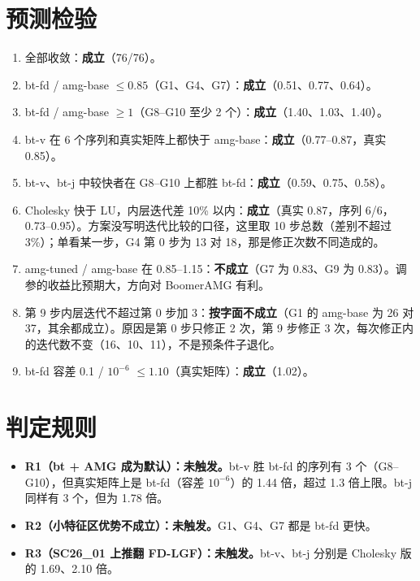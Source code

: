 \documentclass[11pt,a4paper]{ctexart}
\begin{document}
\section{预测检验}
\begin{enumerate}
\item 全部收敛：\textbf{成立}（76/76）。
\item bt-fd / amg-base $\le0.85$（G1、G4、G7）：\textbf{成立}（0.51、0.77、0.64）。
\item bt-fd / amg-base $\ge1$（G8--G10 至少 2 个）：\textbf{成立}（1.40、1.03、1.40）。
\item bt-v 在 6 个序列和真实矩阵上都快于 amg-base：\textbf{成立}（0.77--0.87，真实 0.85）。
\item bt-v、bt-j 中较快者在 G8--G10 上都胜 bt-fd：\textbf{成立}（0.59、0.75、0.58）。
\item Cholesky 快于 LU，内层迭代差 10\% 以内：\textbf{成立}（真实 0.87，序列 6/6，0.73--0.95）。方案没写明迭代比较的口径，这里取 10 步总数（差别不超过 3\%）；单看某一步，G4 第 0 步为 13 对 18，那是修正次数不同造成的。
\item amg-tuned / amg-base 在 0.85--1.15：\textbf{不成立}（G7 为 0.83、G9 为 0.83）。调参的收益比预期大，方向对 BoomerAMG 有利。
\item 第 9 步内层迭代不超过第 0 步加 3：\textbf{按字面不成立}（G1 的 amg-base 为 26 对 37，其余都成立）。原因是第 0 步只修正 2 次，第 9 步修正 3 次，每次修正内的迭代数不变（16、10、11），不是预条件子退化。
\item bt-fd 容差 0.1 / $10^{-6}$ $\le1.10$（真实矩阵）：\textbf{成立}（1.02）。
\end{enumerate}

\section{判定规则}
\begin{itemize}
\item \textbf{R1（bt + AMG 成为默认）：未触发。}bt-v 胜 bt-fd 的序列有 3 个（G8--G10），但真实矩阵上是 bt-fd（容差 $10^{-6}$）的 1.44 倍，超过 1.3 倍上限。bt-j 同样有 3 个，但为 1.78 倍。
\item \textbf{R2（小特征区优势不成立）：未触发。}G1、G4、G7 都是 bt-fd 更快。
\item \textbf{R3（SC26\_01 上推翻 FD-LGF）：未触发。}bt-v、bt-j 分别是 Cholesky 版的 1.69、2.10 倍。
\end{itemize}
\end{document}
